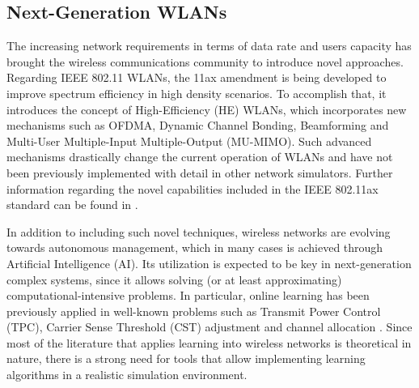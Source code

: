 \documentclass[a4paper]{article}
\begin{document}
	\subsection{Next-Generation WLANs}
	\label{section:ng_wlans}
	The increasing network requirements in terms of data rate and users capacity has brought the wireless communications community to introduce novel approaches. Regarding IEEE 802.11 WLANs, the 11ax amendment is being developed to improve spectrum efficiency in high density scenarios. To accomplish that, it introduces the concept of High-Efficiency (HE) WLANs, which incorporates new mechanisms such as OFDMA, Dynamic Channel Bonding, Beamforming and Multi-User Multiple-Input Multiple-Output (MU-MIMO). Such advanced mechanisms drastically change the current operation of WLANs and have not been previously implemented with detail in other network simulators. Further information regarding the novel capabilities included in the IEEE 802.11ax standard can be found in \cite{bellalta2016ieee}.
	
	In addition to including such novel techniques, wireless networks are evolving towards autonomous management, which in many cases is achieved through Artificial Intelligence (AI). Its utilization is expected to be key in next-generation complex systems, since it allows solving (or at least approximating) computational-intensive problems. In particular, online learning has been previously applied in well-known problems such as Transmit Power Control (TPC), Carrier Sense Threshold (CST) adjustment and channel allocation \cite{wilhelmi2017implications, wilhelmi2017collaborative, maghsudi2015joint, maghsudi2015channel}. Since most of the literature that applies learning into wireless networks is theoretical in nature, there is a strong need for tools that allow implementing learning algorithms in a realistic simulation environment.	
	
\end{document}
